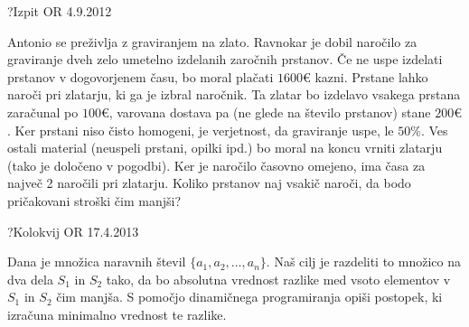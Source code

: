\begin{naloga}{?}{Izpit OR 4.9.2012}
\begin{vprasanje}
Antonio se preživlja z graviranjem na zlato.
Ravnokar je dobil naročilo za graviranje
dveh zelo umetelno izdelanih zaročnih prstanov.
Če ne uspe izdelati prstanov v dogovorjenem času,
bo moral plačati $1600 €$ kazni.
Prstane lahko naroči pri zlatarju, ki ga je izbral naročnik.
Ta zlatar bo izdelavo vsakega prstana zaračunal po $100 €$,
varovana dostava pa (ne glede na število prstanov) stane $200 €$.
Ker prstani niso čisto homogeni,
je verjetnost, da graviranje uspe, le $50 \%$.
Ves ostali material (neuspeli prstani, opilki ipd.)
bo moral na koncu vrniti zlatarju (tako je določeno v pogodbi).
Ker je naročilo časovno omejeno, ima časa za največ 2 naročili pri zlatarju.
Koliko prstanov naj vsakič naroči, da bodo pričakovani stroški čim manjši?
\end{vprasanje}
\begin{odgovor}
\end{odgovor}
\end{naloga}


\begin{naloga}{?}{Kolokvij OR 17.4.2013}
\begin{vprasanje}
Dana je množica naravnih števil $\{a_1, a_2, \dots, a_n\}$.
Naš cilj je razdeliti to množico na dva dela $S_1$ in $S_2$ tako,
da bo absolutna vrednost razlike
med vsoto elementov v $S_1$ in $S_2$ čim manjša.
S pomočjo dinamičnega programiranja opiši postopek,
ki izračuna minimalno vrednost te razlike.
\end{vprasanje}
\begin{odgovor}
\end{odgovor}
\end{naloga}


